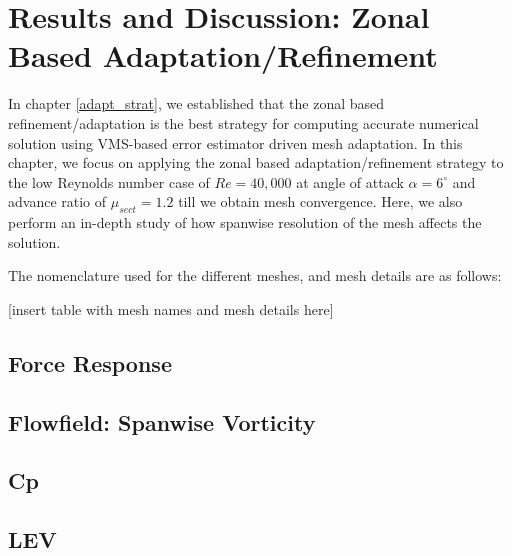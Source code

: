 \chapter{Results and Discussion: Zonal Based Adaptation/Refinement}

In chapter \ref{adapt_strat}, we established that the zonal based refinement/adaptation is the best strategy for computing accurate numerical solution using VMS-based error estimator driven mesh adaptation. In this chapter, we focus on applying the zonal based adaptation/refinement strategy to the low Reynolds number case of $Re=40,000$ at angle of attack $\alpha=6^\circ$ and advance ratio of $\mu_{sect}=1.2$ till we obtain mesh convergence. Here, we also perform an in-depth study of how spanwise resolution of the mesh affects the solution.

The nomenclature used for the different meshes, and mesh details are as follows:

[insert table with mesh names and mesh details here]


\section{Force Response}

\label{sec:zonal_force_response}

\section{Flowfield: Spanwise Vorticity}

\label{sec:zonal_vorticity}

\section{Cp}

\label{sec:zonal_cp}

\section{LEV}

\label{sec:zonal_LEV}